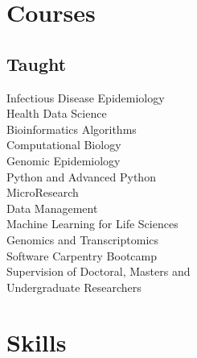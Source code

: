 \documentclass[]{Finlay_Maguire_CV}
\begin{document}
\begin{minipage}[t]{0.33\textwidth}
    \vspace{-0.3cm}
\section{Courses}
\subsection{Taught}
Infectious Disease Epidemiology\\
Health Data Science\\
Bioinformatics Algorithms\\
Computational Biology\\
Genomic Epidemiology\\
Python and Advanced Python\\
MicroResearch\\
Data Management\\
Machine Learning for Life Sciences\\
Genomics and Transcriptomics\\
Software Carpentry Bootcamp\\
Supervision of Doctoral, Masters and \\ Undergraduate Researchers\\
\sectionsep



\section{Skills}

\end{minipage}
\end{document}
